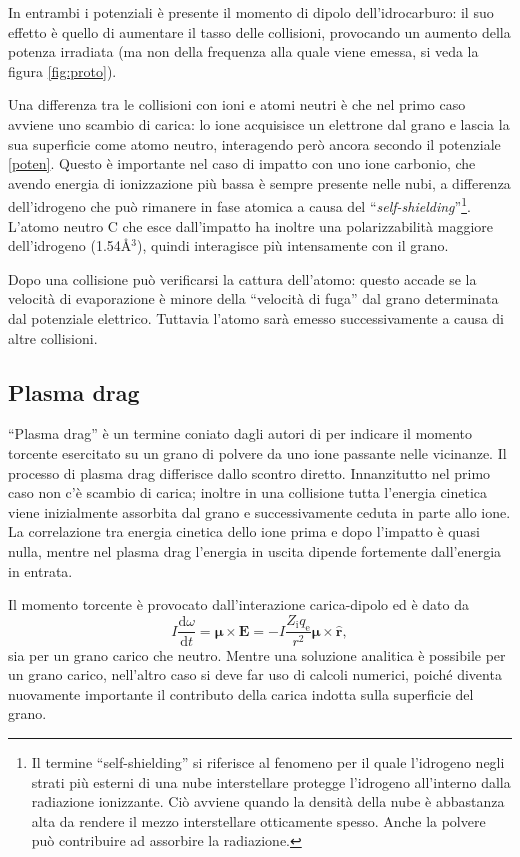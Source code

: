 In entrambi i potenziali è presente il momento di dipolo dell'idrocarburo: il suo effetto è quello di aumentare il tasso delle collisioni, provocando un aumento della potenza irradiata (ma non della frequenza alla quale viene emessa, si veda la figura \ref{fig:proto}).

Una differenza tra le collisioni con ioni e atomi neutri è che nel primo caso avviene uno scambio di carica: lo ione acquisisce un elettrone dal grano e lascia la sua superficie come atomo neutro, interagendo però ancora secondo il potenziale \ref{poten}. Questo è importante nel caso di impatto con uno ione carbonio, che avendo energia di ionizzazione più bassa è sempre presente nelle nubi, a differenza dell'idrogeno che può rimanere in fase atomica a causa del ``\textit{self-shielding}''\footnote{Il termine ``self-shielding'' si riferisce al fenomeno per il quale l'idrogeno negli strati più esterni di una nube interstellare protegge l'idrogeno all'interno dalla radiazione ionizzante. Ciò avviene quando la densità della nube è abbastanza alta da rendere il mezzo interstellare otticamente spesso. Anche la polvere può contribuire ad assorbire la radiazione.}. L'atomo neutro C che esce dall'impatto ha inoltre una polarizzabilità maggiore dell'idrogeno (1.54\AA{}$^3$), quindi interagisce più intensamente con il grano.

Dopo una collisione può verificarsi la cattura dell'atomo: questo accade se la velocità di evaporazione è minore della ``velocità di fuga'' dal grano determinata dal potenziale elettrico. Tuttavia l'atomo sarà emesso successivamente a causa di altre collisioni.


\subsection{Plasma drag}

``Plasma drag'' è un termine coniato dagli autori di \textcite{DL98b} per indicare il momento torcente esercitato su un grano di polvere da uno ione passante nelle vicinanze.
Il processo di plasma drag differisce dallo scontro diretto. Innanzitutto nel primo caso non c'è scambio di carica; inoltre in una collisione tutta l'energia cinetica viene inizialmente assorbita dal grano e successivamente ceduta in parte allo ione. La correlazione tra energia cinetica dello ione prima e dopo l'impatto è quasi nulla, mentre nel plasma drag l'energia in uscita dipende fortemente dall'energia in entrata.

Il momento torcente è provocato dall'interazione carica-dipolo ed è dato da
\begin{equation}
I \frac{\mathrm{d}\omega}{\mathrm{d}t} = \boldsymbol{\mu} \times \boldsymbol{E} = - I \frac{Z_{\mathrm{i}}q_{\mathrm{e}}}{r^2} \boldsymbol{\mu} \times \boldsymbol{\hat{r}},
\end{equation}
sia per un grano carico che neutro. Mentre una soluzione analitica è possibile per un grano carico, nell'altro caso si deve far uso di calcoli numerici, poiché diventa nuovamente importante il contributo della carica indotta sulla superficie del grano.

